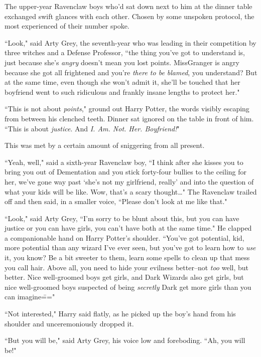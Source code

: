 The upper-year Ravenclaw boys who'd sat down next to him at the dinner table exchanged swift glances with each other. Chosen by some unspoken protocol, the most experienced of their number spoke.

``Look," said Arty Grey, the seventh-year who was leading in their competition by three witches and a Defense Professor, ``the thing you've got to understand is, just because she's \emph{angry} doesn't mean you lost points. Miss\?Granger is angry because she got all frightened and you're \emph{there to be blamed}, you understand? But at the same time, even though she won't admit it, she'll be touched that her boyfriend went to such ridiculous and frankly insane lengths to protect her."

``This is not about \emph{points}," ground out Harry Potter, the words visibly escaping from between his clenched teeth. Dinner sat ignored on the table in front of him. ``This is about \emph{justice}. And \emph{I\@. Am. Not. Her. Boyfriend!}"

This was met by a certain amount of sniggering from all present.

``Yeah, well," said a sixth-year Ravenclaw boy, ``I think after she kisses you to bring you out of Dementation and you stick forty-four bullies to the ceiling for her, we've gone way past `she's not my girlfriend, really' and into the question of what your kids will be like. Wow, that's a scary thought{\ldots}" The Ravenclaw trailed off and then said, in a smaller voice, ``Please don't look at me like that."

``Look," said Arty Grey, ``I'm sorry to be blunt about this, but you can have justice or you can have girls, you can't have both at the same time." He clapped a companionable hand on Harry Potter's shoulder. ``You've got potential, kid, more potential than any wizard I've ever seen, but you've got to learn how to \emph{use} it, you know? Be a bit sweeter to them, learn some spells to clean up that mess you call hair. Above all, you need to hide your evilness better\---not \emph{too} well, but better. Nice well-groomed boys get girls, and Dark Wizards also get girls, but nice well-groomed boys suspected of being \emph{secretly} Dark get more girls than you can imagine\==="

``Not interested," Harry said flatly, as he picked up the boy's hand from his shoulder and unceremoniously dropped it.

``But you will be," said Arty Grey, his voice low and foreboding. ``Ah, you will be!"

